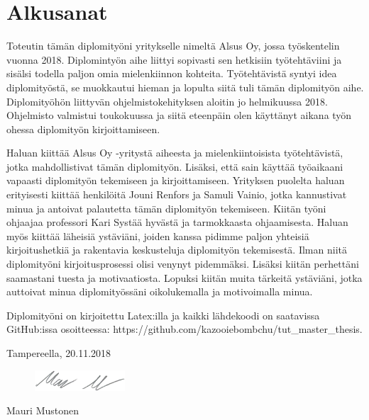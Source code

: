 \chapter*{Alkusanat}
\label{ch:alkusanat}
Toteutin tämän diplomityöni yritykselle nimeltä Alsus Oy, jossa työskentelin vuonna 2018. Diplomintyön aihe liittyi sopivasti sen hetkisiin työtehtäviini ja sisälsi todella paljon omia mielenkiinnon kohteita. Työtehtävistä syntyi idea diplomityöstä, se muokkautui hieman ja lopulta siitä tuli tämän diplomityön aihe. Diplomityöhön liittyvän ohjelmistokehityksen aloitin jo helmikuussa 2018. Ohjelmisto valmistui toukokuussa ja siitä eteenpäin olen käyttänyt aikana työn ohessa diplomityön kirjoittamiseen.

Haluan kiittää Alsus Oy -yritystä aiheesta ja mielenkiintoisista työtehtävistä, jotka mahdollistivat tämän diplomityön. Lisäksi, että sain käyttää työaikaani vapaasti diplomityön tekemiseen ja kirjoittamiseen. Yrityksen puolelta haluan erityisesti kiittää henkilöitä Jouni Renfors ja Samuli Vainio, jotka kannustivat minua ja antoivat palautetta tämän diplomityön tekemiseen. Kiitän työni ohjaajaa professori Kari Systää hyvästä ja tarmokkaasta ohjaamisesta. Haluan myös kiittää läheisiä ystäviäni, joiden kanssa pidimme paljon yhteisiä kirjoitushetkiä ja rakentavia keskusteluja diplomityön tekemisestä. Ilman niitä diplomityöni kirjoitusprosessi olisi venynyt pidemmäksi. Lisäksi kiitän perhettäni saamastani tuesta ja motivaatiosta. Lopuksi kiitän muita tärkeitä ystäviäni, jotka auttoivat minua diplomityössäni oikolukemalla ja motivoimalla minua.

Diplomityöni on kirjoitettu Latex:illa ja kaikki lähdekoodi on saatavissa GitHub:issa osoitteessa: https://github.com/kazooiebombchu/tut\_master\_thesis.

\vspace{2\baselineskip}

Tampereella, 20.11.2018

\begin{figure}[ht!]
	\includegraphics[width=0.3\textwidth,left]{pictures/signature.png}
\end{figure}

Mauri Mustonen